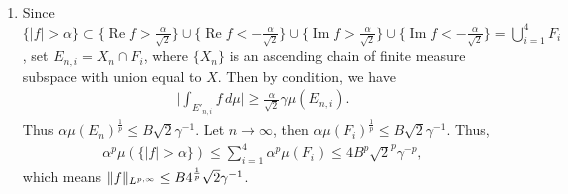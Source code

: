 \begin{enumerate}
\begin{enumerate}
   \item[(b)] Since $\{|f|>\alpha\} \subset \{\operatorname{Re} f > \frac{\alpha}{\sqrt{2}}\} 
   \cup \{\operatorname{Re} f < -\frac{\alpha}{\sqrt{2}}\} 
   \cup \{\operatorname{Im} f > \frac{\alpha}{\sqrt{2}}\} 
   \cup \{\operatorname{Im} f < -\frac{\alpha}{\sqrt{2}}\} 
   = \bigcup_{i=1}^{4}F_{i}$, 
   set $E_{n,i} = X_{n} \cap F_{i}$, where $\{X_{n}\}$ is an ascending chain of 
   finite measure subspace with union equal to $X$. Then by condition, we have
   \begin{equation*}\begin{aligned}
   \bigg|\int_{E'_{n,i}}f\,d\mu\bigg| 
   \geq \frac{\alpha}{\sqrt{2}}\gamma\mu(E_{n,i}).
   \end{aligned}\end{equation*}
   Thus $\alpha \mu(E_{n})^{\frac{1}{p}} \leq B\sqrt{2}\gamma^{-1}$. 
   Let $n \to \infty$, then 
   $\alpha\mu(F_{i})^{\frac{1}{p}} \leq B\sqrt{2}\gamma^{-1}$. Thus,
   \begin{equation*}\begin{aligned}
   \alpha^{p} \mu(\{|f|>\alpha\}) \leq \sum_{i=1}^{4}\alpha^{p}\mu(F_{i}) \leq 4B^{p}\sqrt{2}^{p}\gamma^{-p},
   \end{aligned}\end{equation*}
   which means $\Vert f \Vert_{L^{p,\infty}} \leq B4^{\frac{1}{p}}\sqrt{2}\gamma^{-1}$.
   \end{enumerate}
\end{enumerate}